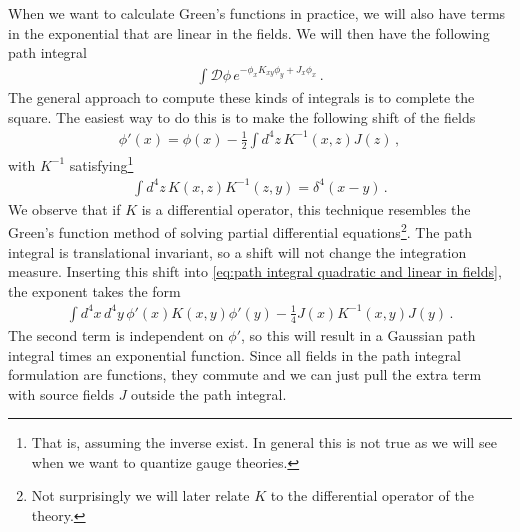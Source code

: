 When we want to calculate Green's functions in practice, we will also have terms in the exponential that are linear in the fields. We will then have the following path integral
\begin{align}\label{eq:path integral quadratic and linear in fields}
    \int\mathcal{D}\phi\,e^{-\phi_{x} K_{xy}\phi_{y}+J_{x}\phi_{x}}\,.
\end{align}
The general approach to compute these kinds of integrals is to complete the square. The easiest way to do this is to make the following shift of the fields
\begin{align}\label{eq:shift fields}
    \phi'(x)=\phi(x)-\frac{1}{2}\int d^{4}z\,K^{-1}(x,z)J(z)\,,
\end{align}
with $K^{-1}$ satisfying\footnote{That is, assuming the inverse exist. In general this is not true as we will see when we want to quantize gauge theories.}
\begin{align}\label{eq:normalization Kahler}
    \int d^{4}z\,K(x,z)K^{-1}(z,y)=\delta^{4}(x-y)\,.
\end{align}
We observe that if $K$ is a differential operator, this technique resembles the Green's function method of solving partial differential equations\footnote{Not surprisingly we will later relate $K$ to the differential operator of the theory.}. The path integral is translational invariant, so a shift will not change the integration measure. Inserting this shift into \cref{eq:path integral quadratic and linear in fields}, the exponent takes the form
\begin{align}
    \int d^{4}x\,d^{4}y\,\phi'(x)K(x,y)\phi'(y)-\frac{1}{4}J(x)K^{-1}(x,y)J(y)\,.
\end{align}
The second term is independent on $\phi'$, so this will result in a Gaussian path integral times an exponential function. Since all fields in the path integral formulation are functions, they commute and we can just pull the extra term with source fields $J$ outside the path integral. 

